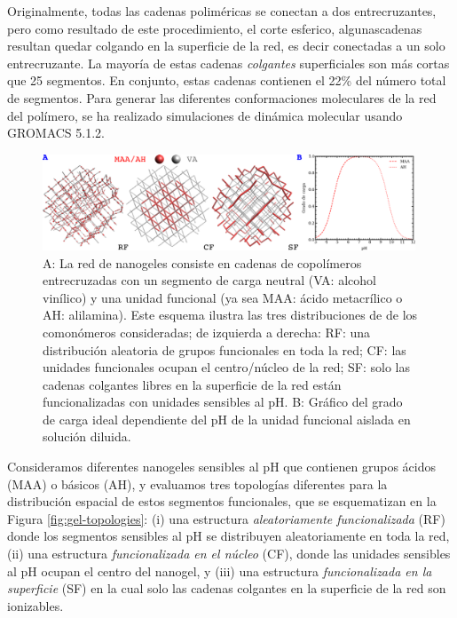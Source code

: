 Originalmente, todas las cadenas polim\'ericas se  conectan a dos entrecruzantes, pero como resultado de este procedimiento, el corte esferico, algunascadenas resultan quedar colgando en la superficie de la red, es decir  conectadas a un solo entrecruzante. La mayor\'ia de estas cadenas \emph{colgantes} superficiales son m\'as cortas que 25 segmentos. En conjunto, estas cadenas contienen el 22\% del n\'umero total de segmentos. Para generar las diferentes conformaciones moleculares de la red del pol\'imero, se ha realizado simulaciones de din\'amica molecular usando GROMACS 5.1.2\cite{lindahl2001gromacs}.

 \begin{figure}[!htb]
     \centering
     \includegraphics[width=0.99\textwidth]{Figures/graphs-gel2/ideal-charge-model.pdf}
     \caption{A: La red de nanogeles consiste en cadenas de copol\'imeros entrecruzadas con un segmento de carga neutral (VA: alcohol vin\'ilico) y una unidad funcional (ya sea MAA: \'acido metacr\'ilico o AH: alilamina).
     	Este esquema ilustra las tres distribuciones de de los comon\'omeros consideradas; de izquierda a derecha: RF: una distribuci\'on aleatoria de grupos funcionales en toda la red; CF: las unidades funcionales ocupan el centro/n\'ucleo de la red; SF: solo las cadenas colgantes libres en la superficie de la red est\'an funcionalizadas con unidades sensibles al pH.
     	B: Gr\'afico del grado de carga ideal dependiente del pH de la unidad funcional aislada en soluci\'on diluida.}
     \label{fig:esf:gel-topologies}
 \end{figure}


 
 
 Consideramos diferentes nanogeles sensibles al pH que contienen grupos \'acidos (MAA) o b\'asicos (AH), y evaluamos tres topolog\'ias diferentes para la distribuci\'on espacial de estos segmentos funcionales, que se esquematizan en la Figura \ref{fig:gel-topologies}:
 (i) una estructura \emph{aleatoriamente funcionalizada} (RF) donde los segmentos sensibles al pH se distribuyen aleatoriamente en toda la red,
 (ii) una estructura \emph{funcionalizada en el n\'ucleo} (CF), donde las unidades sensibles al pH ocupan el centro del nanogel, y
 (iii) una estructura \emph{funcionalizada en la superficie} (SF) en la cual solo las cadenas colgantes en la superficie de la red son ionizables.
  







